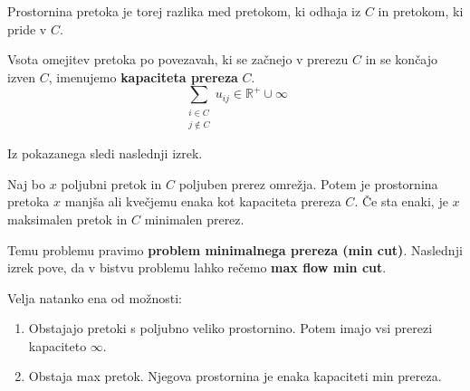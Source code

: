 \documentclass[11pt, a4paper]{article}
\begin{document}
    Prostornina pretoka je torej razlika med pretokom, ki odhaja iz \(C\) in pretokom, ki pride v \(C\).

    \begin{definition}
        Vsota omejitev pretoka po povezavah, ki se začnejo v prerezu \(C\) in se končajo izven \(C\), imenujemo \textbf{kapaciteta prereza} \(C\).
        \[
            \sum_{\substack{i \in C \\ j \notin C}} u_{ij} \in \mathbb{R}^+ \cup \infty
        \]
    \end{definition}

    Iz pokazanega sledi naslednji izrek.
    \begin{theorem}
        Naj bo \(x\) poljubni pretok in \(C\) poljuben prerez omrežja. Potem je prostornina pretoka \(x\) manjša ali kvečjemu enaka kot kapaciteta prereza \(C\). Če sta enaki, je \(x\) maksimalen pretok in \(C\) minimalen prerez.
    \end{theorem}

    Temu problemu pravimo \textbf{problem minimalnega prereza (min cut)}. Naslednji izrek pove, da v bistvu problemu lahko rečemo \textbf{max flow min cut}.

    \begin{theorem}
        Velja natanko ena od možnosti:
        \begin{enumerate}[label=(\alph*)]
            \item Obstajajo pretoki s poljubno veliko prostornino. Potem imajo vsi prerezi kapaciteto \(\infty\).
            \item Obstaja max pretok. Njegova prostornina je enaka kapaciteti min prereza.
        \end{enumerate}
    \end{theorem}
\end{document}
